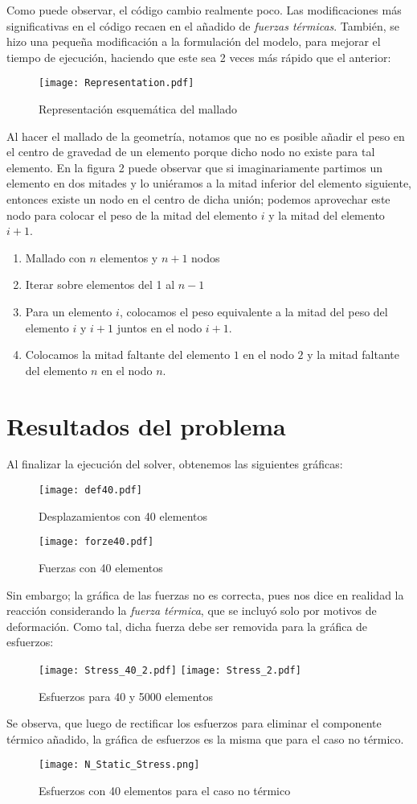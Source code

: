 \documentclass[10pt,a4paper]{article}
\begin{document}
Como puede observar, el código cambio realmente poco. Las modificaciones más significativas en el código recaen en el añadido de \textit{fuerzas térmicas}. También, se hizo una pequeña modificación a la formulación del modelo, para mejorar el tiempo de ejecución, haciendo que este sea 2 veces más rápido que el anterior:
\begin{figure}[H]
    \centering
    \texttt{[image: Representation.pdf]}
    \caption{Representación esquemática del mallado}
\end{figure}
Al hacer el mallado de la geometría, notamos que no es posible añadir el peso en el centro de gravedad de un elemento porque dicho nodo no existe para tal elemento. En la figura 2 puede observar que si imaginariamente partimos un elemento en dos mitades y lo uniéramos a la mitad inferior del elemento siguiente, entonces existe un nodo en el centro de dicha unión; podemos aprovechar este nodo para colocar el peso de la mitad del elemento $i$ y la mitad del elemento $i+1$.
\begin{enumerate}
    \item Mallado con $n$ elementos y $n+1$ nodos
    \item Iterar sobre elementos del 1 al $n-1$
    \item Para un elemento $i$, colocamos el peso equivalente a la mitad del peso del elemento $i$ y $i+1$ juntos en el nodo $i+1$.
    \item Colocamos la mitad faltante del elemento $1$ en el nodo $2$ y la mitad faltante del elemento $n$ en el nodo $n$.
\end{enumerate}
\section{Resultados del problema}
Al finalizar la ejecución del solver, obtenemos las siguientes gráficas:
\begin{figure}[H]
    \centering
    \texttt{[image: def40.pdf]}
    \caption{Desplazamientos con 40 elementos}
    \texttt{[image: forze40.pdf]}
    \caption{Fuerzas con 40 elementos}
\end{figure}
Sin embargo; la gráfica de las fuerzas no es correcta, pues nos dice en realidad la reacción considerando la \textit{fuerza térmica}, que se incluyó solo por motivos de deformación. Como tal, dicha fuerza debe ser removida para la gráfica de esfuerzos:
\begin{figure}[H]
    \centering
    \texttt{[image: Stress\_40\_2.pdf]}
    \texttt{[image: Stress\_2.pdf]}
    \caption{Esfuerzos para 40 y 5000 elementos}
\end{figure}
Se observa, que luego de rectificar los esfuerzos para eliminar el componente térmico añadido, la gráfica de esfuerzos es la misma que para el caso no térmico. 
\begin{figure}[H]
    \centering
    \texttt{[image: N\_Static\_Stress.png]}
    \caption{Esfuerzos con 40 elementos para el caso no térmico}
\end{figure}
\end{document}
